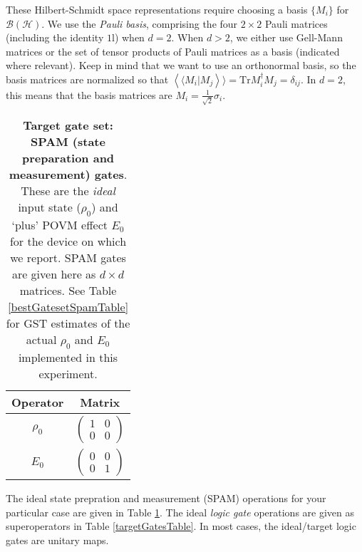 \documentclass{article}[11pt]
\newcommand{\rrangle}{\rangle\!\rangle} \newcommand{\llangle}{\langle\!\langle}
\newcommand{\sbraket}[2]{\ensuremath{\left\llangle#1|#2\right\rrangle}}
\def\Id{1\!\mathrm{l}}
\newcommand{\Tr}[0]{\mathrm{Tr}}
\begin{document}
These Hilbert-Schmidt space representations require choosing a basis $\{M_i\}$ for $\mathcal{B}(\mathcal{H})$.  We use the \emph{Pauli basis}, comprising the four $2\times2$ Pauli matrices (including the identity $\Id$) when $d=2$.  When $d>2$, we either use Gell-Mann matrices or the set of tensor products of Pauli matrices as a basis (indicated where relevant).  Keep in mind that we want to use an orthonormal basis, so the basis matrices are normalized so that $\sbraket{M_i}{M_j} = \Tr M_i^\dagger M_j = \delta_{ij}$.  In $d=2$, this means that the basis matrices are $M_i = \frac{1}{\sqrt{2}}\sigma_i$.

\begin{table}[h]
\begin{center}
\begin{tabular}[l]{|c|c|}
\hline
Operator & Matrix \\ \hline
$\rho_{0}$ & $ \left(\!\!\begin{array}{cc}
1 & 0 \\ 
0 & 0
 \end{array}\!\!\right) $
 \\ \hline
$E_{0}$ & $ \left(\!\!\begin{array}{cc}
0 & 0 \\ 
0 & 1
 \end{array}\!\!\right) $
 \\ \hline
\end{tabular}

\caption{\textbf{Target gate set: SPAM (state preparation and measurement) gates}.  These are the \emph{ideal} input state ($\rho_0$) and `plus' POVM effect $E_0$ for the device on which we report.  SPAM gates are given here as $d\times d$ matrices.  See Table \ref{bestGatesetSpamTable} for GST estimates of the actual $\rho_0$ and $E_0$ implemented in this experiment.\label{targetSpamTable}}
\end{center}
\end{table}

The ideal state prepration and measurement (SPAM) operations for your particular case are given in Table \ref{targetSpamTable}.  The ideal \emph{logic gate} operations are given as superoperators in Table \ref{targetGatesTable}.  In most cases, the ideal/target logic gates are unitary maps.  
\end{document}
